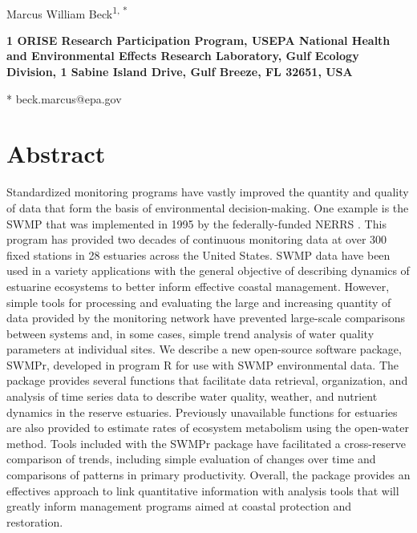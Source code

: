 \documentclass[10pt,letterpaper]{article}\usepackage[]{graphicx}\usepackage[]{color}
\date{}
\begin{document}
\vspace*{0.35in}

\begin{flushleft}
{\Large
\textbf{}
}
\newline
\\
Marcus William Beck\textsuperscript{1, *}

\bigskip
\bf{1} ORISE Research Participation Program, USEPA National Health and Environmental Effects Research Laboratory, Gulf Ecology Division, 1 Sabine Island Drive, Gulf Breeze, FL 32651, USA
\\
\bigskip

* beck.marcus@epa.gov

\end{flushleft}
\section*{Abstract}
Standardized monitoring programs have vastly improved the quantity and quality of data that form the basis of environmental decision-making.  One example is the \ac{SWMP} that was implemented in 1995 by the federally-funded \ac{NERRS} .  This program has provided two decades of continuous monitoring data at over 300 fixed stations in 28 estuaries across the United States.  \ac{SWMP} data have been used in a variety applications with the general objective of describing dynamics of estuarine ecosystems to better inform effective coastal management.  However, simple tools for processing and evaluating the large and increasing quantity of data provided by the monitoring network have prevented large-scale comparisons between systems and, in some cases, simple trend analysis of water quality parameters at individual sites.  We describe a new open-source software package, SWMPr, developed in program R for use with \ac{SWMP} environmental data.  The package provides several functions that facilitate data retrieval, organization, and analysis of time series data to describe water quality, weather, and nutrient dynamics in the reserve estuaries.  Previously unavailable functions for estuaries are also provided to estimate rates of ecosystem metabolism using the open-water method.  Tools included with the SWMPr package have facilitated a cross-reserve comparison of trends, including simple evaluation of changes over time and comparisons of patterns in primary productivity.  Overall, the package provides an effectives approach to link quantitative information with analysis tools that will greatly inform management programs aimed at coastal protection and restoration.
\end{document}
